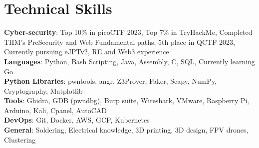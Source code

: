 \section{Technical Skills}

\begin{itemize}[leftmargin=0.15in, label={}]
    \small{\item{
        \textbf{Cyber-security}{: Top 10\% in picoCTF 2023, Top 7\% in TryHackMe, Completed THM's PreSecurity and Web Fundamental paths, 5th place in QCTF 2023, Currently pursuing eJPTv2, RE and Web3 experience} \\ \vspace{2mm}
        \textbf{Languages}{: Python, Bash Scripting, Java, Assembly, C, SQL, Currently learning Go} \\ \vspace{2mm}
        \textbf{Python Libraries}{: pwntools, angr, Z3Prover, Faker, Scapy, NumPy, Cryptography, Matplotlib} \\ \vspace{2mm}
        \textbf{Tools}{: Ghidra, GDB (pwndbg), Burp suite, Wireshark, VMware, Raspberry Pi, Arduino, Kali, Cpanel, AutoCAD} \\ \vspace{2mm}
        \textbf{DevOps}{: Git, Docker, AWS, GCP, Kubernetes}\\ \vspace{2mm}
        \textbf{General}{: Soldering, Electrical knowledge, 3D printing, 3D design, FPV drones, Clustering}\\

    }}
\end{itemize}